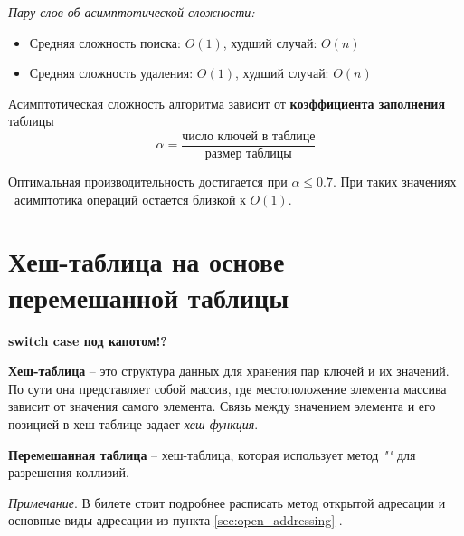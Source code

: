 \vspace{10pt}

\textit{Пару слов об асимптотической сложности:}\par
\begin{itemize}[label=$\triangleright$, font=\scriptsize, noitemsep, topsep=0pt, , partopsep=0pt]
	\item {\footnotesize Средняя сложность поиска: $O(1)$, худший случай: $O(n)$}
	\item {\footnotesize Средняя сложность удаления: $O(1)$, худший случай: $O(n)$}
\end{itemize}
\par
\vspace{5pt}
Асимптотическая сложность алгоритма зависит от \textbf{коэффициента заполнения} таблицы
\[
\alpha = \frac{\text{число ключей в таблице}}{\text{размер таблицы}}
\]\par
Оптимальная производительность достигается при $\alpha \leq 0.7$. При таких значениях \alpha \ асимптотика операций остается близкой к $O(1)$.
\vspace{50pt}



\section{Хеш-таблица на основе перемешанной таблицы}
\vspace{-20pt} {\tiny \textbf{\qquad \qquad switch case под капотом!?}}

\textbf{Хеш-таблица} -- это структура данных для хранения пар ключей и их значений. По сути она представляет собой массив, где местоположение элемента массива зависит от значения самого элемента. Связь между значением элемента и его позицией в хеш-таблице задает \textit{хеш-функция}.

\textbf{Перемешанная таблица} -- хеш-таблица, которая использует метод \textit{""} для разрешения коллизий.\par
\vspace{5pt}
{\footnotesize \textit{Примечание}. В билете стоит подробнее расписать метод открытой адресации и основные виды адресации из пункта \ref{sec:open_addressing} .}
\vspace{5pt}

